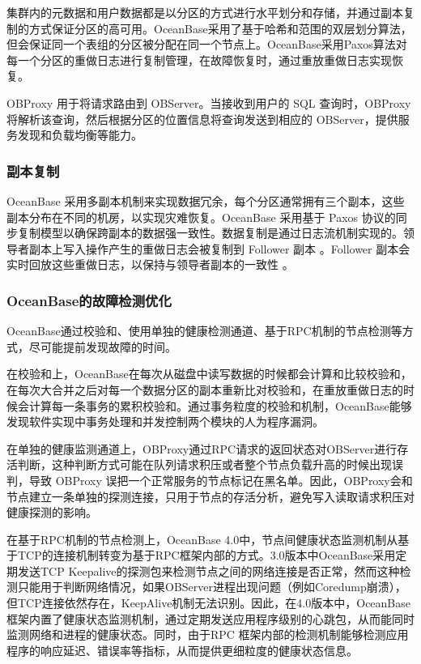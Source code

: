 集群内的元数据和用户数据都是以分区的方式进行水平划分和存储，并通过副本复制的方式保证分区的高可用。OceanBase采用了基于哈希和范围的双层划分算法，但会保证同一个表组的分区被分配在同一个节点上。OceanBase采用Paxos算法对每一个分区的重做日志进行复制管理，在故障恢复时，通过重放重做日志实现恢复。

OBProxy 用于将请求路由到 OBServer。当接收到用户的 SQL 查询时，OBProxy 将解析该查询，然后根据分区的位置信息将查询发送到相应的 OBServer，提供服务发现和负载均衡等能力。


\subsubsection{副本复制}

OceanBase 采用多副本机制来实现数据冗余，每个分区通常拥有三个副本，这些副本分布在不同的机房，以实现灾难恢复。OceanBase 采用基于 Paxos 协议的同步复制模型以确保跨副本的数据强一致性。数据复制是通过日志流机制实现的。领导者副本上写入操作产生的重做日志会被复制到 Follower 副本 。Follower 副本会实时回放这些重做日志，以保持与领导者副本的一致性 。


\subsubsection{OceanBase的故障检测优化}

OceanBase通过校验和、使用单独的健康检测通道、基于RPC机制的节点检测等方式，尽可能提前发现故障的时间。

在校验和上，OceanBase在每次从磁盘中读写数据的时候都会计算和比较校验和，在每次大合并之后对每一个数据分区的副本重新比对校验和，在重放重做日志的时候会计算每一条事务的累积校验和。通过事务粒度的校验和机制，OceanBase能够发现软件实现中事务处理和并发控制两个模块的人为程序漏洞。

在单独的健康监测通道上，OBProxy通过RPC请求的返回状态对OBServer进行存活判断，这种判断方式可能在队列请求积压或者整个节点负载升高的时候出现误判，导致 OBProxy 误把一个正常服务的节点标记在黑名单。因此，OBProxy会和节点建立一条单独的探测连接，只用于节点的存活分析，避免写入读取请求积压对健康探测的影响。

在基于RPC机制的节点检测上，OceanBase 4.0中，节点间健康状态监测机制从基于TCP的连接机制转变为基于RPC框架内部的方式。3.0版本中OceanBase采用定期发送TCP Keepalive的探测包来检测节点之间的网络连接是否正常，然而这种检测只能用于判断网络情况，如果OBServer进程出现问题（例如Coredump崩溃），但TCP连接依然存在，KeepAlive机制无法识别。因此，在4.0版本中，OceanBase框架内置了健康状态监测机制，通过定期发送应用程序级别的心跳包，从而能同时监测网络和进程的健康状态。同时，由于RPC 框架内部的检测机制能够检测应用程序的响应延迟、错误率等指标，从而提供更细粒度的健康状态信息。



